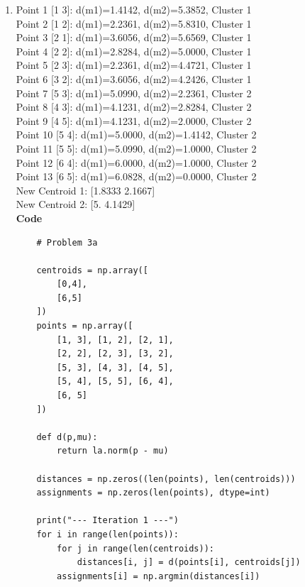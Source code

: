 \documentclass[12pt]{article}
\begin{document}
\begin{enumerate}[label=(\alph*)]

    \item

    Point  1 [1 3]: d(m1)=1.4142, d(m2)=5.3852, Cluster 1 \\
    Point  2 [1 2]: d(m1)=2.2361, d(m2)=5.8310, Cluster 1 \\
    Point  3 [2 1]: d(m1)=3.6056, d(m2)=5.6569, Cluster 1 \\
    Point  4 [2 2]: d(m1)=2.8284, d(m2)=5.0000, Cluster 1 \\
    Point  5 [2 3]: d(m1)=2.2361, d(m2)=4.4721, Cluster 1 \\
    Point  6 [3 2]: d(m1)=3.6056, d(m2)=4.2426, Cluster 1 \\
    Point  7 [5 3]: d(m1)=5.0990, d(m2)=2.2361, Cluster 2 \\
    Point  8 [4 3]: d(m1)=4.1231, d(m2)=2.8284, Cluster 2 \\
    Point  9 [4 5]: d(m1)=4.1231, d(m2)=2.0000, Cluster 2 \\
    Point 10 [5 4]: d(m1)=5.0000, d(m2)=1.4142, Cluster 2 \\
    Point 11 [5 5]: d(m1)=5.0990, d(m2)=1.0000, Cluster 2 \\
    Point 12 [6 4]: d(m1)=6.0000, d(m2)=1.0000, Cluster 2 \\
    Point 13 [6 5]: d(m1)=6.0828, d(m2)=0.0000, Cluster 2 \\

    New Centroid 1: [1.8333 2.1667] \\
    New Centroid 2: [5.     4.1429] \\

    \textbf{Code}
    \begin{lstlisting}
    # Problem 3a

    centroids = np.array([
        [0,4],
        [6,5]
    ])
    points = np.array([
        [1, 3], [1, 2], [2, 1],
        [2, 2], [2, 3], [3, 2],
        [5, 3], [4, 3], [4, 5],
        [5, 4], [5, 5], [6, 4],
        [6, 5]
    ])

    def d(p,mu):
        return la.norm(p - mu)

    distances = np.zeros((len(points), len(centroids)))
    assignments = np.zeros(len(points), dtype=int)

    print("--- Iteration 1 ---")
    for i in range(len(points)):
        for j in range(len(centroids)):
            distances[i, j] = d(points[i], centroids[j])
        assignments[i] = np.argmin(distances[i])
        

\end{lstlisting}
\end{enumerate}
\end{document}
